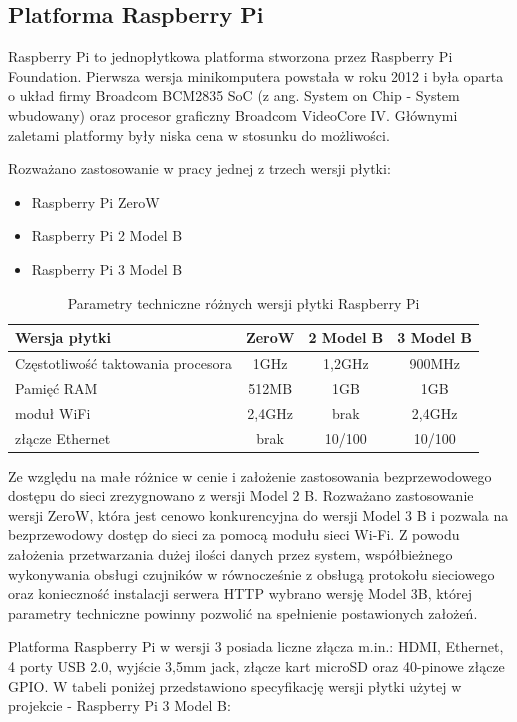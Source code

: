 \subsection{Platforma Raspberry Pi}

Raspberry Pi to jednopłytkowa platforma stworzona przez Raspberry Pi Foundation. Pierwsza wersja minikomputera powstała w roku 2012 i była oparta o układ firmy Broadcom BCM2835 SoC (z ang. System on Chip - System wbudowany) oraz procesor graficzny Broadcom VideoCore IV.\cite{rpispecs} Głównymi zaletami platformy były niska cena w stosunku do możliwości.

Rozważano zastosowanie w pracy jednej z trzech wersji płytki:
\begin{itemize}
\item Raspberry Pi ZeroW
\item Raspberry Pi 2 Model B
\item Raspberry Pi 3 Model B 
\end{itemize}

\begin{table}[h]
\label{tabRpi}
\centering
\begin{tabular}{|l|c|c|c|}
  \hline 
  Wersja płytki & ZeroW & 2 Model B & 3 Model B\\
  \hline
  Częstotliwość taktowania procesora &1GHz&1,2GHz&900MHz\\
  \hline
  Pamięć RAM&512MB&1GB&1GB\\
  \hline
 moduł WiFi & 2,4GHz & brak & 2,4GHz\\
  \hline
  złącze Ethernet & brak &10/100& 10/100\\
  \hline
\end{tabular}
\caption{Parametry techniczne różnych wersji płytki Raspberry Pi
} 
\end{table}

Ze względu na małe różnice w cenie i założenie zastosowania bezprzewodowego dostępu do sieci zrezygnowano z wersji Model 2 B. Rozważano zastosowanie wersji ZeroW, która jest cenowo konkurencyjna do wersji Model 3 B i pozwala na bezprzewodowy dostęp do sieci za pomocą modułu sieci Wi-Fi. Z powodu założenia przetwarzania dużej ilości danych przez system, współbieżnego wykonywania obsługi czujników
w równocześnie z obsługą protokołu sieciowego oraz konieczność instalacji serwera HTTP wybrano wersję Model 3B, której parametry techniczne powinny pozwolić na spełnienie postawionych założeń.

Platforma Raspberry Pi w wersji 3 posiada liczne złącza m.in.: HDMI, Ethernet, 4 porty USB 2.0, wyjście 3,5mm jack, złącze kart microSD oraz 40-pinowe złącze GPIO. W tabeli poniżej przedstawiono specyfikację\cite{rpispecs} wersji płytki użytej w projekcie - Raspberry Pi 3 Model B:

